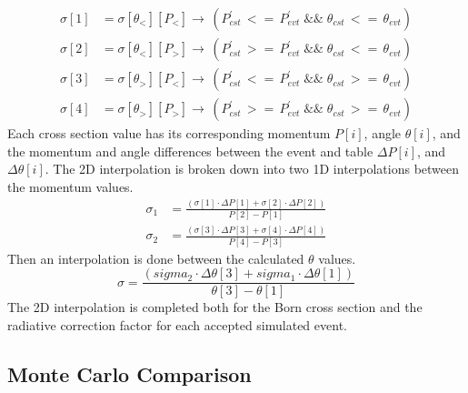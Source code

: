 \begin{align}
 	\sigma[1] &=\sigma[\theta_<][P_<]\rightarrow\,(P^{\prime}_{cst}\, <=\, P^{\prime}_{evt}\; \&\& \;\theta_{cst}\, <=\, \theta_{evt}) \nonumber\\
	\sigma[2] &=\sigma[\theta_<][P_>]\rightarrow\,(P^{\prime}_{cst}\, >=\, P^{\prime}_{evt}\; \&\& \;\theta_{cst}\, <=\, \theta_{evt}) \nonumber\\
	\sigma[3] &=\sigma[\theta_>][P_<]\rightarrow\,(P^{\prime}_{cst}\, <=\, P^{\prime}_{evt}\; \&\& \;\theta_{cst}\, >=\, \theta_{evt}) \nonumber\\
	\sigma[4] &=\sigma[\theta_>][P_>]\rightarrow\,(P^{\prime}_{cst}\, >=\, P^{\prime}_{evt}\; \&\& \;\theta_{cst}\, >=\, \theta_{evt})
\end{align}
Each cross section value has its corresponding momentum $P[i]$, angle $\theta[i]$, and the momentum and angle differences between the event and table  $\Delta P[i]$, and $\Delta \theta[i]$. The 2D interpolation is broken down into two 1D interpolations between the momentum values.
\begin{align}
\sigma_1 &= \frac{\left(\sigma[1] \cdot \Delta P[1] +  \sigma[2] \cdot \Delta P[2] \right)} {P[2]-P[1]}\nonumber\\
\sigma_2 &= \frac{\left(\sigma[3] \cdot \Delta P[3] +  \sigma[4] \cdot \Delta P[4] \right)} {P[4]-P[3]}
\end{align}
Then an interpolation is done between the calculated $\theta$ values.
\begin{equation}
\sigma = \frac{\left(sigma_2 \cdot \Delta \theta[3] + sigma_1 \cdot \Delta \theta[1]\right) }{\theta[3] -\theta[1]}
\end{equation}
The 2D interpolation is completed both for the Born cross section and the radiative correction factor for each accepted simulated event.
\subsection{Monte Carlo Comparison}
